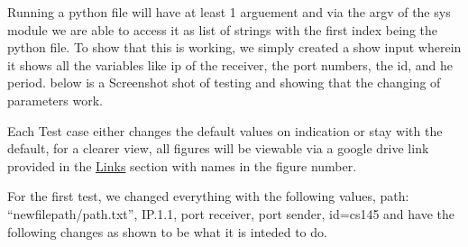 \documentclass[a4paper]{article} %
\begin{document}
    Running a python file will have at least 1 arguement and via the argv of the sys module
    we are able to access it as list of strings with the first index being the python file.
    To show that this is working, we simply created a show input 
    wherein it shows all the variables like ip of the receiver, the port numbers,
    the id, and he period.
    below is a Screenshot shot of testing and showing that the changing of parameters work.
    \begin{center}
    \end{center}
    Each Test case either changes the default values on indication or
    stay with the default, for a clearer view, all figures will be viewable via a google drive link provided in the \hyperlink{glink}{Links} section with 
    names in the figure number.

    For the first test, we changed everything with the following values,
    path: ``newfilepath/path.txt'',
    IP.1.1,
    port receiver,
    port sender,
    id=cs145 and have the following changes as shown to be what it is inteded to do.
\end{document}
